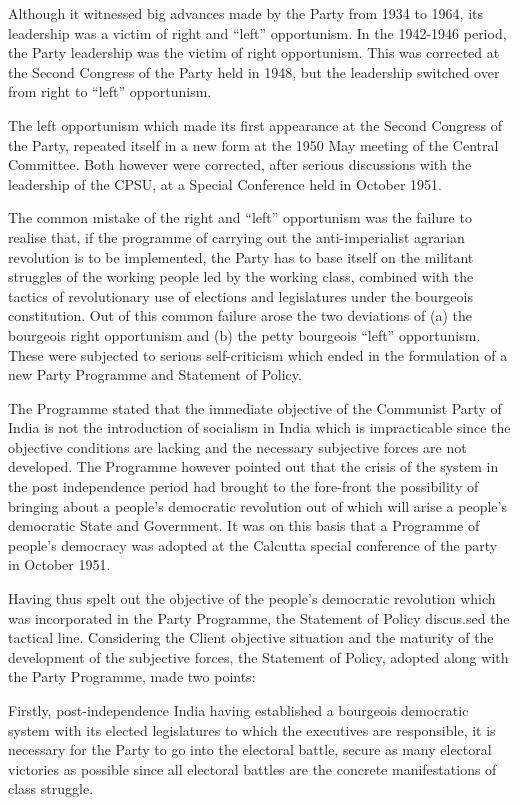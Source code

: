 Although it witnessed big advances made by the Party from 1934 to 1964, its leadership was a victim of right and “left” opportunism. In the 1942-1946 period, the Party leadership was the 
victim of right opportunism. This was corrected at the Second Congress of the Party held in 1948, but the leadership switched over from right to “left” opportunism. 

The left opportunism which made its first appearance at the Second Congress of the Party, repeated itself in a new form at the 1950 May meeting of the Central Committee. Both however 
were corrected, after serious discussions with the leadership of the CPSU, at a Special Conference held in October 1951. 

The common mistake of the right and “left” opportunism was the failure to realise that, if the programme of carrying out the anti-imperialist agrarian revolution is to be implemented, the 
Party has to base itself on the militant struggles of the working people led by the working class, combined with the tactics of revolutionary use of elections and legislatures under the bourgeois constitution. Out of this common failure arose the two deviations of (a) the bourgeois right opportunism and (b) the petty bourgeois “left” opportunism. These were subjected to serious self-criticism which ended in the formulation of a new Party Programme and Statement of Policy. 

The Programme stated that the immediate objective of the Communist Party of India is not the introduction of socialism in India which is impracticable since the objective conditions are lacking and the necessary subjective forces are not developed. The Programme however pointed out that the crisis of the system in the post independence period had brought to the fore-front the possibility of bringing about a people’s democratic revolution out of which will arise a people’s democratic State and Government. It was on this basis that a Programme of people’s democracy was adopted at the Calcutta special conference of the party in October 1951. 

Having thus spelt out the objective of the people’s democratic revolution which was incorporated in the Party Programme, the Statement of Policy discus.sed the tactical line. Considering the Client objective situation and the maturity of the development of the subjective forces, the Statement of Policy, adopted along with the Party Programme, made two points:

Firstly, post-independence India having established a bourgeois democratic system with its elected legislatures to which the executives are responsible, it is necessary for the Party to go into the electoral battle, secure as many electoral victories as possible since all electoral battles are the concrete manifestations of class struggle.

